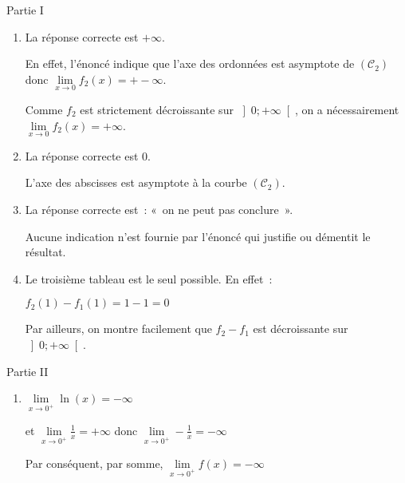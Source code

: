 \begin{corrige}
     \begin{h3} Partie I \end{h3}
     \begin{enumerate}
          \item
          La réponse correcte est $+\infty $.
          \par
          En effet, l'énoncé indique que l'axe des ordonnées est asymptote de $\left(\mathscr C_{2}\right)$ donc $\lim\limits_{x\rightarrow 0} f_{2}\left(x\right)=+-\infty $.
          \par
          Comme $f_{2}$ est strictement décroissante sur $\left]0;+\infty \right[$, on a nécessairement $\lim\limits_{x\rightarrow 0} f_{2}\left(x\right)=+\infty $.
          \item
          La réponse correcte est 0.
          \par
          L'axe des abscisses est asymptote à la courbe $\left(\mathscr C_{2}\right)$.
          \item
          La réponse correcte est : « on ne peut pas conclure ».
          \par
          Aucune indication n'est fournie par l'énoncé qui justifie ou démentit le résultat.
          \item
          Le troisième tableau est le seul possible. En effet :
          \par
          $f_{2}\left(1\right)-f_{1}\left(1\right)=1-1=0$
          \par
          Par ailleurs, on montre facilement que $f_{2}-f_{1}$ est décroissante sur $\left]0;+\infty \right[$.
     \end{enumerate}
     \begin{h3} Partie II \end{h3}
     \begin{enumerate}
          \item
          $\lim\limits_{x\rightarrow 0^+ }  \ln\left(x\right)=-\infty   $
          \par
          et  $ \lim\limits_{x\rightarrow 0^+ }\frac{1}{x}=+\infty $ donc $ \lim\limits_{x\rightarrow 0^+ } -\frac{1}{x}=-\infty $
          \par
          Par conséquent, par somme,  $\lim\limits_{x\rightarrow 0^+ } f\left(x\right)=-\infty $
          \par


\end{enumerate}
\end{corrige}
